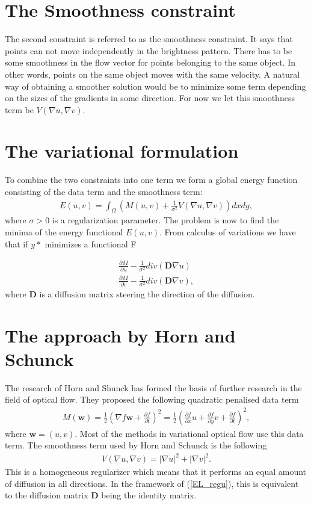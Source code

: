 \documentclass[10pt,a4paper]{article}
\begin{document}
\section{The Smoothness constraint}
The second constraint is referred to as the smoothness constraint. It says that points can not move independently in the brightness pattern. There has to be some smoothness in the flow vector for points belonging to the same object. In other words, points on the same object moves with the same velocity. A natural way of obtaining a smoother solution would be to minimize some term depending on the sizes of the gradients in some direction. For now we let this smoothness term be $V(\nabla u, \nabla v)$.

\section{The variational formulation}
To combine the two constraints into one term we form a global energy function consisting of the data term and the smoothness term:
\begin{align}
E(u,v) = \int_\Omega (M(u,v) + \frac{1}{\sigma^2} V(\nabla u, \nabla v)) dx dy,
\end{align}
where $\sigma > 0$ is a regularization parameter. The problem is now to find the minima of the energy functional $E(u,v)$. From calculus of variations we have that if $y*$ minimizes a functional F

\begin{equation}
\label{EL_regu}
  \begin{aligned}
\frac{\partial M}{\partial u} - \frac{1}{\sigma^2} div(\textbf{D} \nabla u) \\
\frac{\partial M}{\partial v} - \frac{1}{\sigma^2} div(\textbf{D} \nabla v),
  \end{aligned}
\end{equation}
where \textbf{D} is a diffusion matrix steering the direction of the diffusion.


\section{The approach by Horn and Schunck}
The research of Horn and Shunck \cite{HS} has formed the basis of further research in the field of optical flow. They proposed the following quadratic penalised data term
\begin{align}
M(\textbf{w}) = \frac{1}{2}(\nabla f \textbf{w} + \frac{\partial f}{\partial t})^2 = \frac{1}{2}(\frac{\partial f}{\partial x} u + \frac{\partial f}{\partial y} v + \frac{\partial f}{\partial t})^2,
\end{align}
where $\textbf{w} = (u,v)$. Most of the methods in variational optical flow use this data term. The smoothness term used by Horn and Schunck is the following
\begin{align*}
V(\nabla u, \nabla v) = |\nabla u|^2 + |\nabla v|^2.
\end{align*}
This is a homogeneous regularizer which means that it performs an equal amount of diffusion in all directions. In the framework of (\ref{EL_regu}), this is equivalent to the diffusion matrix \textbf{D} being the identity matrix.
\end{document}
